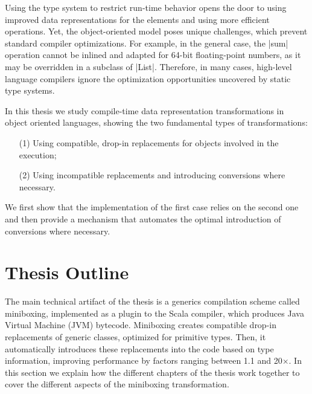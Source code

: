Using the type system to restrict run-time behavior opens the door to using improved data representations for the elements and using more efficient operations. Yet, the object-oriented model poses unique challenges, which prevent standard compiler optimizations. For example, in the general case, the |sum| operation cannot be inlined and adapted for 64-bit floating-point numbers, as it may be overridden in a subclass of |List|. Therefore, in many cases, high-level language compilers ignore the optimization opportunities uncovered by static type systems.


In this thesis we study compile-time data representation transformations in object oriented languages, showing the two fundamental types of transformations:

\begin{itemize}
  \item[(1)] Using compatible, drop-in replacements for objects involved in the execution;
  \item[(2)] Using incompatible replacements and introducing conversions where necessary.
\end{itemize}

We first show that the implementation of the first case relies on the second one and then provide a mechanism that automates the optimal introduction of conversions where necessary.

\section{Thesis Outline}

The main technical artifact of the thesis is a generics compilation scheme called miniboxing, implemented as a plugin to the Scala compiler, which produces Java Virtual Machine (JVM) bytecode. Miniboxing creates compatible drop-in replacements of generic classes, optimized for primitive types. Then, it automatically introduces these replacements into the code based on type information, improving performance by factors ranging between 1.1 and 20$\times$. In this section we explain how the different chapters of the thesis work together to cover the different aspects of the miniboxing transformation.

